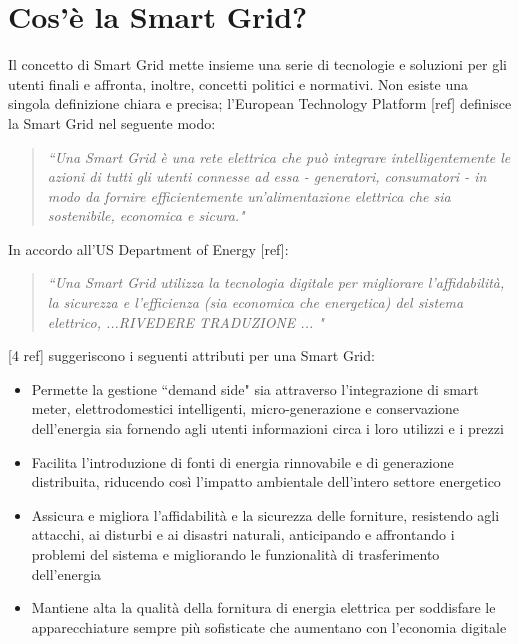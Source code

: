 \section{Cos'è la Smart Grid?}
Il concetto di Smart Grid mette insieme una serie di tecnologie e soluzioni per gli utenti finali e affronta, inoltre, concetti politici e normativi. \newline Non esiste una singola definizione chiara e precisa; l'European Technology Platform [ref] definisce la Smart Grid nel seguente modo:
\begin{quote}
\textit{``Una Smart Grid è una rete elettrica che può integrare intelligentemente le azioni di tutti gli utenti connesse ad essa - generatori, consumatori - in modo da fornire efficientemente un'alimentazione elettrica che sia sostenibile, economica e sicura."}
\end{quote}
In accordo all'US Department of Energy [ref]:
\begin{quote}
\textit{``Una Smart Grid utilizza la tecnologia digitale per migliorare l'affidabilità, la sicurezza e l'efficienza (sia economica che energetica) del sistema elettrico, ...RIVEDERE TRADUZIONE ... "}
\end{quote}
[4 ref] suggeriscono i seguenti attributi per una Smart Grid:
\begin{itemize}
\item Permette la gestione ``demand side" sia attraverso l'integrazione di smart meter, elettrodomestici intelligenti, micro-generazione e conservazione dell'energia sia fornendo agli utenti informazioni circa i loro utilizzi e i prezzi
\item Facilita l'introduzione di fonti di energia rinnovabile e di generazione distribuita, riducendo così l'impatto ambientale dell'intero settore energetico 
\item Assicura e migliora l'affidabilità e la sicurezza delle forniture, resistendo agli attacchi, ai disturbi e ai disastri naturali, anticipando e affrontando i problemi del sistema e migliorando le funzionalità di trasferimento dell'energia
\item Mantiene alta la qualità della fornitura di energia elettrica per soddisfare le apparecchiature sempre più sofisticate che aumentano con l'economia digitale
\end{itemize}
\begin{figure}[h]
\end{figure}

